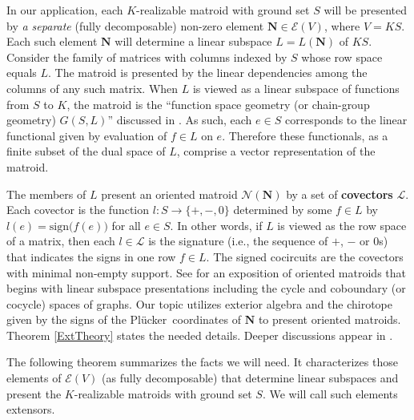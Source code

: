 \documentclass[12pt]{article}
\theoremstyle{definition}
\newcommand{\FieldK}{\ensuremath{K}}
\newcommand{\ext}[1]{\ensuremath{\mathbf{#1}}}
\newcommand{\Plucker}{Pl\"{u}cker\ }
\begin{document}
In our application, each $\FieldK$-realizable matroid with ground
set $S$ will be presented by \emph{a separate} 
(fully decomposable) non-zero
element $\ext{N}\in\mathcal{E}(V)$, where $V=\FieldK S$.  
Each such element $\ext{N}$ 
will determine a linear subspace $L=L(\ext{N})$ of $\FieldK S$.
Consider the family of matrices with 
columns indexed by $S$ whose row space equals $L$.
The matroid
is presented by the linear dependencies among the columns
of any such matrix.  When $L$ is viewed as a linear 
subspace of functions from $S$ to $\FieldK$, the matroid
is the ``function space geometry (or chain-group geometry)
$G(S,L)$'' discussed in \cite[.C]{TheoryMatroids}.
As such, each $e\in S$ corresponds to the linear 
functional given by evaluation of $f\in L$ on $e$.
Therefore these functionals, as a
finite subset of the dual space of $L$, 
comprise a vector representation of the matroid.

The members of $L$ present an oriented matroid
$\mathcal{N}(\ext{N})$ by a set of 
\textbf{covectors} $\mathcal{L}$.  Each covector
is the function $l:S\rightarrow\{+,-,0\}$ determined
by some $f\in L$ by $l(e)=\mbox{sign}\big(f(e)\big)$ for
all $e\in S$.  
In other words, if $L$ is viewed as the row space of a matrix,
then each $l\in\mathcal{L}$ is the signature (i.e., the sequence
of $+$, $-$ or $0$s) that indicates the signs in one row $f\in L$.
The signed cocircuits are the 
covectors with minimal non-empty support.
See \cite{BachemKern} for an exposition of
oriented matroids that begins with 
linear subspace presentations including
the cycle and coboundary (or cocycle) spaces 
of graphs.  
Our topic utilizes exterior algebra
and the chirotope given by the
signs of the \Plucker coordinates of $\ext{N}$
to present oriented
matroids.
Theorem \ref{ExtTheory} states the needed details.
Deeper discussions appear in 
\cite[especially  on stratifications of the
Grassmann variety and chap. 8 on realizations]{OMBOOK}.

The following
theorem summarizes the facts we will need.  It characterizes those
elements of $\mathcal{E}(V)$ (as fully decomposable) that determine linear subspaces
and present the $\FieldK$-realizable matroids with ground set $S$.
We will call such elements extensors.
\end{document}
